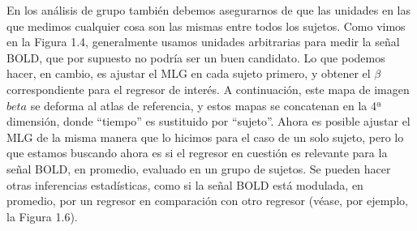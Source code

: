 \documentclass[12pt,a5,twoside]{book}
\begin{document}
En los análisis de grupo también debemos asegurarnos de que las unidades en las que medimos cualquier cosa son las mismas entre todos los sujetos. Como vimos en la Figura 1.4, generalmente usamos unidades arbitrarias para medir la señal BOLD, que por supuesto no podría ser un buen candidato. Lo que podemos hacer, en cambio, es ajustar el MLG en cada sujeto primero, y obtener el \(\beta\) correspondiente para el regresor de interés. A continuación, este mapa de imagen \(beta\) se deforma al atlas de referencia, y estos mapas se concatenan en la 4ª dimensión, donde ``tiempo'' es sustituido por ``sujeto''. Ahora es posible ajustar el MLG de la misma manera que lo hicimos para el caso de un solo sujeto, pero lo que estamos buscando ahora es si el regresor en cuestión es relevante para la señal BOLD, en promedio, evaluado en un grupo de sujetos. Se pueden hacer otras inferencias estadísticas, como si la señal BOLD está modulada, en promedio, por un regresor en comparación con otro regresor (véase, por ejemplo, la Figura 1.6).
\end{document}
